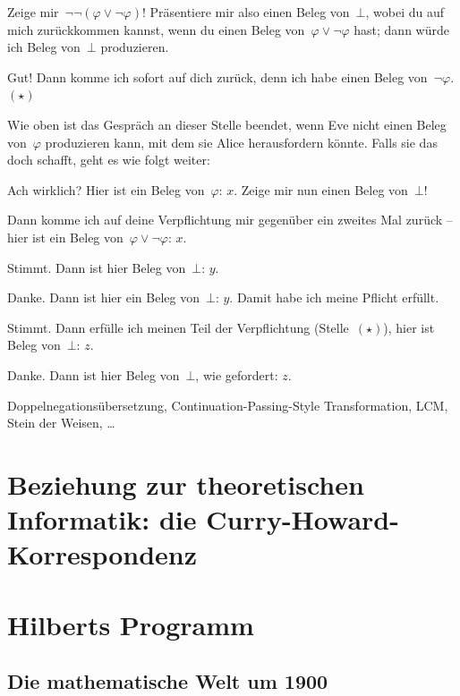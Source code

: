 \documentclass[a4paper,ngerman,12pt]{scrartcl}
\theoremstyle{definition}
\theoremstyle{plain}
\theoremstyle{remark}
\renewcommand{\_}{\mathpunct{.}\,}
\newcommand{\?}{\,{:}\,}
\newcommand{\Alice}{\item[Alice]}
\newcommand{\Eve}{\item[Eve]}
\newenvironment{dialogue}{%
  \begin{list}{}{%
    \settowidth{\labelwidth}{\qquad\emph{Alice:}}
    \setlength{\labelsep}{0.3cm}
    \setlength{\leftmargin}{\labelwidth}
    \addtolength{\leftmargin}{\labelsep}
    \setlength{\rightmargin}{0pt}
    \setlength{\parsep}{0.5ex plus 0.2ex minus 0.1ex}
    \setlength{\itemsep}{0 ex plus 0.2ex}
    \renewcommand{\makelabel}[1]{\qquad\emph{##1:}\hfil}
    }
}{\end{list}}
\begin{document}
\begin{dialogue}
\Eve Zeige mir~$\neg\neg(\varphi \vee \neg\varphi)$!
Präsentiere mir also einen Beleg von~$\bot$, wobei du auf mich zurückkommen
kannst, wenn du einen Beleg von~$\varphi \vee \neg\varphi$ hast; dann
würde ich Beleg von~$\bot$ produzieren.
\Alice Gut! Dann komme ich sofort auf dich zurück, denn ich habe einen Beleg
von~$\neg\varphi$. $(\star)$
\end{dialogue}

Wie oben ist das Gespräch an dieser Stelle beendet, wenn Eve nicht einen Beleg
von~$\varphi$ produzieren kann, mit dem sie Alice herausfordern könnte. Falls
sie das doch schafft, geht es wie folgt weiter:

\begin{dialogue}
\Eve Ach wirklich? Hier ist ein Beleg von~$\varphi$: $x$. Zeige mir nun einen
Beleg von~$\bot$!
\Alice Dann komme ich auf deine Verpflichtung mir gegenüber ein zweites Mal
zurück -- hier ist ein Beleg von~$\varphi \vee \neg\varphi$: $x$.
\Eve Stimmt. Dann ist hier Beleg von~$\bot$: $y$.
\Alice Danke. Dann ist hier ein Beleg von~$\bot$: $y$. Damit habe ich meine
Pflicht erfüllt.
\Eve Stimmt. Dann erfülle ich meinen Teil der Verpflichtung (Stelle~$(\star)$),
hier ist Beleg von~$\bot$: $z$.
\Alice Danke. Dann ist hier Beleg von~$\bot$, wie gefordert: $z$.
\end{dialogue}



Doppelnegationsübersetzung, Continuation-Passing-Style Transformation,
LCM, Stein der Weisen, \ldots



\section[Beziehung zur theoretischen Informatik: die
Curry-Howard-Korrespondenz]{Beziehung zur theoretischen Informatik: \newline die
Curry-Howard-Korrespondenz}


\section{Hilberts Programm}

\subsection{Die mathematische Welt um 1900}
\end{document}
